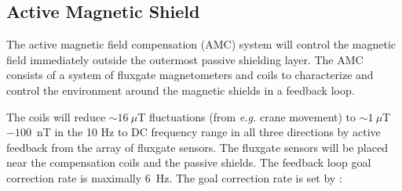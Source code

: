 









\subsection{Active Magnetic Shield}\label{sec:amc}

The active magnetic field compensation (AMC) system will control the magnetic field immediately outside the outermost passive shielding layer. The AMC consists of a system of fluxgate magnetometers and coils to characterize and control the environment around the magnetic shields in a feedback loop. 


The coils will reduce $\sim16~\mu$T fluctuations (from {\it e.g.} crane movement) to $\sim1~\mu$T$-100$~nT in the 10 Hz to DC frequency range in all three directions by active feedback from the array of fluxgate sensors. The fluxgate sensors will be placed near the compensation coils and the passive shields. The feedback loop goal correction rate is maximally 6~Hz. The goal correction rate is set by :

